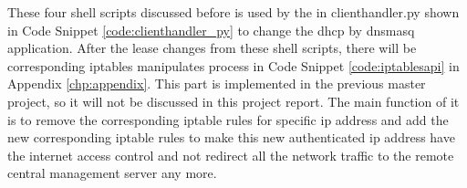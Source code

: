 \par These four shell scripts discussed before is used by the in clienthandler.py shown in Code Snippet \ref{code:clienthandler_py} to change the \gls{dhcp} by dnsmasq application. After the lease changes from these shell scripts, there will be corresponding iptables manipulates process in Code Snippet \ref{code:iptablesapi} in Appendix \ref{chp:appendix}. This part is implemented in the previous master project, so it will not be discussed in this project report. The main function of it is to remove the corresponding iptable rules for specific \gls{ip} address and add the new corresponding iptable rules to make this new authenticated \gls{ip} address have the internet access control and not redirect all the network traffic to the remote central management server any more.